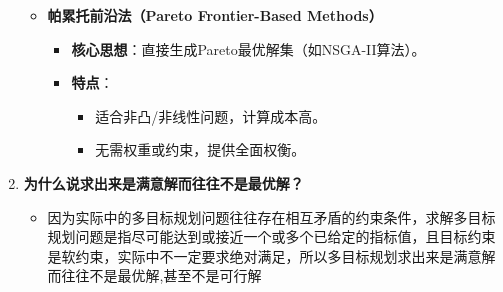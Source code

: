 \begin{enumerate}
\begin{itemize}
			\item \textbf{帕累托前沿法（Pareto Frontier-Based Methods）}
			\begin{itemize}
				\item \textbf{核心思想}：直接生成Pareto最优解集（如NSGA-II算法）。
				\item \textbf{特点}：
				\begin{itemize}
					\item 适合非凸/非线性问题，计算成本高。
					\item 无需权重或约束，提供全面权衡。
				\end{itemize}
			\end{itemize}
		\end{itemize}
		\item \textbf{为什么说求出来是满意解而往往不是最优解？}
		\begin{itemize}
			\item 因为实际中的多目标规划问题往往存在相互矛盾的约束条件，求解多目标规划问题是指尽可能达到或接近一个或多个已给定的指标值，且目标约束是软约束，实际中不一定要求绝对满足，所以多目标规划求出来是满意解而往往不是最优解,甚至不是可行解
		\end{itemize}
	\end{enumerate}
